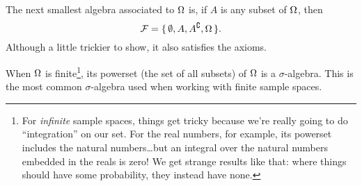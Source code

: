  The next smallest algebra associated to $\Omega$ is,
if $A$ is any subset of $\Omega$, then
\begin{equation}
\mathcal{F}=\{\,\emptyset,A,{A}^{\complement},\Omega\,\}.
\end{equation}
Although a little trickier to show, it also satisfies the axioms.

When $\Omega$ is finite\footnote{For \emph{infinite}
sample spaces, things get tricky because we're really going to do
``integration'' on our set. For the real numbers, for example, its
powerset includes the natural numbers\dots but an integral over the
natural numbers embedded in the reals is zero! We get strange results 
like that: where things should have some probability, they instead
have none.}, its powerset (the set of all subsets) of $\Omega$ is
a $\sigma$-algebra. This is the most common $\sigma$-algebra used when
working with finite sample spaces. 
